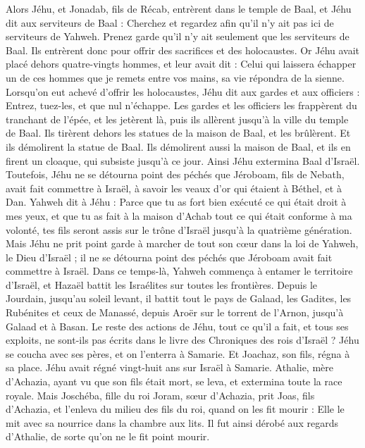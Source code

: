 \begin{multicols}{2}
Alors Jéhu, et Jonadab, fils de Récab, entrèrent dans le temple de Baal, et Jéhu dit aux serviteurs de Baal : Cherchez et regardez afin qu’il n’y ait pas ici de serviteurs de Yahweh. Prenez garde qu’il n’y ait seulement que les serviteurs de Baal.
Ils entrèrent donc pour offrir des sacrifices et des holocaustes. Or Jéhu avait placé dehors quatre-vingts hommes, et leur avait dit : Celui qui laissera échapper un de ces hommes que je remets entre vos mains, sa vie répondra de la sienne.
Lorsqu’on eut achevé d’offrir les holocaustes, Jéhu dit aux gardes et aux officiers : Entrez, tuez-les, et que nul n’échappe. Les gardes et les officiers les frappèrent du tranchant de l’épée, et les jetèrent là, puis ils allèrent jusqu’à la ville du temple de Baal.
Ils tirèrent dehors les statues de la maison de Baal, et les brûlèrent.
Et ils démolirent la statue de Baal. Ils démolirent aussi la maison de Baal, et ils en firent un cloaque, qui subsiste jusqu’à ce jour.
Ainsi Jéhu extermina Baal d’Israël.
Toutefois, Jéhu ne se détourna point des péchés que Jéroboam, fils de Nebath, avait fait commettre à Israël, à savoir les veaux d’or qui étaient à Béthel, et à Dan.
Yahweh dit à Jéhu : Parce que tu as fort bien exécuté ce qui était droit à mes yeux, et que tu as fait à la maison d’Achab tout ce qui était conforme à ma volonté, tes fils seront assis sur le trône d’Israël jusqu’à la quatrième génération.
Mais Jéhu ne prit point garde à marcher de tout son cœur dans la loi de Yahweh, le Dieu d’Israël ; il ne se détourna point des péchés que Jéroboam avait fait commettre à Israël.
Dans ce temps-là, Yahweh commença à entamer le territoire d’Israël, et Hazaël battit les Israélites sur toutes les frontières.
Depuis le Jourdain, jusqu’au soleil levant, il battit tout le pays de Galaad, les Gadites, les Rubénites et ceux de Manassé, depuis Aroër sur le torrent de l’Arnon, jusqu’à Galaad et à Basan.
Le reste des actions de Jéhu, tout ce qu’il a fait, et tous ses exploits, ne sont-ils pas écrits dans le livre des Chroniques des rois d’Israël ?
Jéhu se coucha avec ses pères, et on l’enterra à Samarie. Et Joachaz, son fils, régna à sa place.
Jéhu avait régné vingt-huit ans sur Israël à Samarie.
\VerseOne{}Athalie, mère d’Achazia, ayant vu que son fils était mort, se leva, et extermina toute la race royale.
Mais Joschéba, fille du roi Joram, sœur d’Achazia, prit Joas, fils d’Achazia, et l’enleva du milieu des fils du roi, quand on les fit mourir : Elle le mit avec sa nourrice dans la chambre aux lits. Il fut ainsi dérobé aux regards d’Athalie, de sorte qu’on ne le fit point mourir.

\end{multicols}
